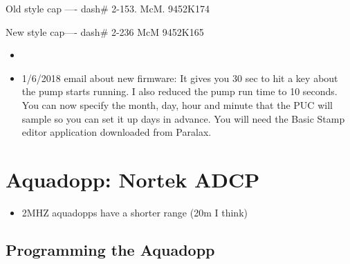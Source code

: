 \documentclass[]{book}
\providecommand{\tightlist}{%
  \setlength{\itemsep}{0pt}\setlength{\parskip}{0pt}}
\begin{document}
Old style cap ---- dash\# 2-153. McM. 9452K174

New style cap---- dash\# 2-236 McM 9452K165

\begin{itemize}
\item
\item
  1/6/2018 email about new firmware: It gives you 30 sec to hit a key about the pump starts running. I also reduced the pump run time to 10 seconds. You can now specify the month, day, hour and minute that the PUC will sample so you can set it up days in advance. You will need the Basic Stamp editor application downloaded from Paralax.
\end{itemize}

\hypertarget{aquadopp-nortek-adcp}{%
\chapter{Aquadopp: Nortek ADCP}\label{aquadopp-nortek-adcp}}

\begin{itemize}
\tightlist
\item
  2MHZ aquadopps have a shorter range (20m I think)
\end{itemize}

\hypertarget{programming-the-aquadopp}{%
\section{Programming the Aquadopp}\label{programming-the-aquadopp}}
\end{document}
